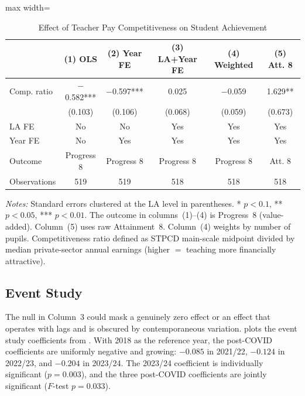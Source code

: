 \documentclass[12pt]{article}
\begin{document}
\begin{table}[H]
\centering
\caption{Effect of Teacher Pay Competitiveness on Student Achievement}
\label{tab:main}
\begin{threeparttable}
\begin{adjustbox}{max width=\textwidth}
\begin{tabular}{lccccc}
\toprule
 & (1) OLS & (2) Year FE & (3) LA+Year FE & (4) Weighted & (5) Att. 8 \\
\midrule
Comp. ratio & $-$0.582*** & $-$0.597*** & 0.025 & $-$0.059 & 1.629** \\
 & (0.103) & (0.106) & (0.068) & (0.059) & (0.673) \\
\midrule
LA FE & No & No & Yes & Yes & Yes \\
Year FE & No & Yes & Yes & Yes & Yes \\
Outcome & Progress 8 & Progress 8 & Progress 8 & Progress 8 & Att. 8 \\
Observations & 519 & 519 & 518 & 518 & 518 \\
\bottomrule
\end{tabular}
\end{adjustbox}
\begin{tablenotes}[flushleft]
\small
\item \textit{Notes:} Standard errors clustered at the LA level in parentheses. * $p<0.1$, ** $p<0.05$, *** $p<0.01$. The outcome in columns~(1)--(4) is Progress~8 (value-added). Column~(5) uses raw Attainment~8. Column~(4) weights by number of pupils. Competitiveness ratio defined as STPCD main-scale midpoint divided by median private-sector annual earnings (higher $=$ teaching more financially attractive).
\end{tablenotes}
\end{threeparttable}
\end{table}


\subsection{Event Study}

The null in  Column~3 could mask a genuinely zero effect or an effect that operates with lags and is obscured by contemporaneous variation.  plots the event study coefficients from . With 2018 as the reference year, the post-COVID coefficients are uniformly negative and growing: $-0.085$ in 2021/22, $-0.124$ in 2022/23, and $-0.204$ in 2023/24. The 2023/24 coefficient is individually significant ($p = 0.003$), and the three post-COVID coefficients are jointly significant ($F$-test $p = 0.033$).
\end{document}
